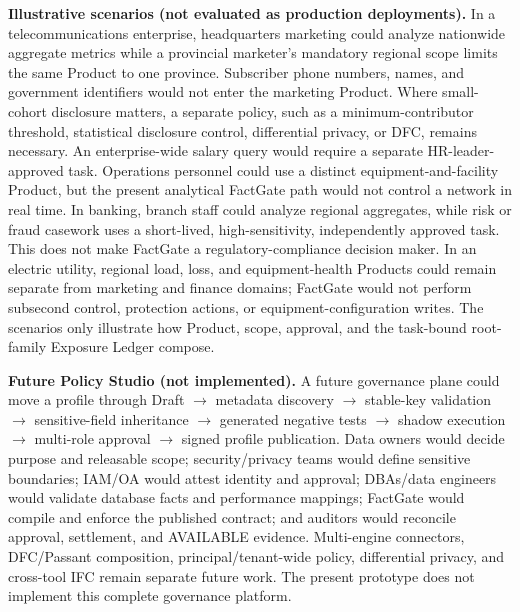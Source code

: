 \documentclass[journal,onecolumn]{IEEEtran}
\begin{document}
\textbf{Illustrative scenarios (not evaluated as production deployments).}
In a telecommunications enterprise, headquarters marketing could analyze
nationwide aggregate metrics while a provincial marketer's mandatory regional
scope limits the same Product to one province. Subscriber phone numbers, names,
and government identifiers would not enter the marketing Product. Where
small-cohort disclosure matters, a separate policy, such as a
minimum-contributor threshold, statistical disclosure control, differential
privacy, or DFC, remains necessary. An enterprise-wide salary query would
require a separate HR-leader-approved task. Operations personnel could use a
distinct equipment-and-facility Product, but the present analytical FactGate path would not
control a network in real time. In banking, branch staff
could analyze regional aggregates, while risk or fraud casework uses a
short-lived, high-sensitivity, independently approved task. This does not make
FactGate a regulatory-compliance decision maker. In an electric utility, regional
load, loss, and equipment-health Products could remain
separate from marketing and finance domains; FactGate would not perform subsecond
control, protection actions, or equipment-configuration writes. The scenarios
only illustrate how Product, scope, approval, and the task-bound root-family
Exposure Ledger compose.

\textbf{Future Policy Studio (not implemented).}
A future governance plane could move a profile through
Draft $\rightarrow$ metadata discovery $\rightarrow$ stable-key validation
$\rightarrow$ sensitive-field inheritance $\rightarrow$ generated negative
tests $\rightarrow$ shadow execution $\rightarrow$ multi-role approval
$\rightarrow$ signed profile publication. Data owners would decide purpose and
releasable scope; security/privacy teams would define sensitive boundaries;
IAM/OA would attest identity and approval; DBAs/data engineers would validate
database facts and performance mappings; FactGate would compile and enforce the
published contract; and auditors would reconcile approval, settlement, and
AVAILABLE evidence. Multi-engine connectors, DFC/Passant composition,
principal/tenant-wide policy, differential privacy, and cross-tool IFC remain
separate future work. The present prototype does not implement this complete
governance platform.
\end{document}
